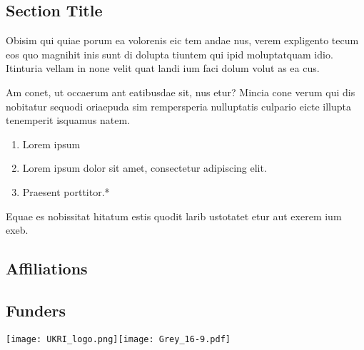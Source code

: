 \documentclass[
	landscape, %
	a1papersize, %
]{ImperialPoster}
\begin{document}
\begin{multicols}{4}
	\section{Section Title}
	
	\begingroup
		\small %
		Obisim qui quiae porum ea volorenis eic tem andae nus, verem expligento tecum eos quo magnihit inis sunt di dolupta tiuntem qui ipid moluptatquam idio. Itinturia vellam in none velit quat landi ium faci dolum volut as ea cus.

		Am conet, ut occaerum ant eatibusdae sit, nus etur? Mincia cone verum qui dis nobitatur sequodi oriaepuda sim rempersperia nulluptatis culpario eicte illupta tenemperit isquamus natem.\par
	\endgroup
	
	
	\begin{enumerate}
		\item Lorem ipsum
		\item Lorem ipsum dolor sit amet, consectetur adipiscing elit.
		\item Praesent porttitor.*
	\end{enumerate}
	
		
	
	Equae es nobissitat hitatum estis quodit larib ustotatet etur aut exerem ium exeb.
	
	\subsection{Affiliations}
	
	
	\subsection{Funders}
	
	\texttt{[image: UKRI\_logo.png]}\hfill\texttt{[image: Grey\_16-9.pdf]} %
	

\end{multicols}

\end{document}

